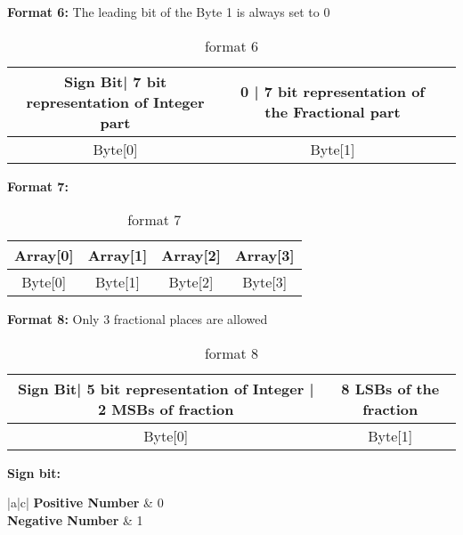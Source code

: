 \textbf{Format 6:} The leading bit of the Byte 1 is always set to 0
\begin{table}[H]
    \centering
    {
    \begin{tabular}{|c|c|c|}
        \hline
        \rowcolor{black!8}
        \textbf{Sign Bit| 7 bit representation of Integer part} & \textbf{ 0 | 7 bit representation of the Fractional part} \\ \hline
        Byte[0] & Byte[1] \\ \hline
    \end{tabular}
    }
    \caption{format 6}
    \label{table:format6}
\end{table}


\textbf{Format 7:}
\begin{table}[H]
    \centering
    {
    \begin{tabular}{|c|c|c|c|}
        \hline
        \rowcolor{black!8}
        \textbf{Array[0]} & \textbf{Array[1]} & \textbf{Array[2]} & \textbf{Array[3]} \\ \hline
        Byte[0] & Byte[1] & Byte[2] & Byte[3] \\ \hline
    \end{tabular}
    }
    \caption{format 7}
    \label{table:format7}
\end{table}


\textbf{Format 8:} Only 3 fractional places are allowed
\begin{table}[H]
    \centering
    {
    \begin{tabular}{|c|c|}
        \hline
        \rowcolor{black!8}
        \textbf{Sign Bit| 5 bit representation of Integer | 2 MSBs of fraction} & \textbf{8 LSBs of the fraction} \\ \hline
        Byte[0] & Byte[1] \\ \hline
    \end{tabular}
    }
    \caption{format 8}
    \label{table:format8}
\end{table}


\textbf{Sign bit:}
\begin{table}[H]
    \centering
    {
    \begin{tabular}{|a|c|}
        \hline
        \textbf{Positive Number} & 0 \\ \hline
        \textbf{Negative Number} & 1 \\ \hline
    \end{tabular}
    }
    \caption{Sign bit}
    \label{table:signBit}
\end{table}
